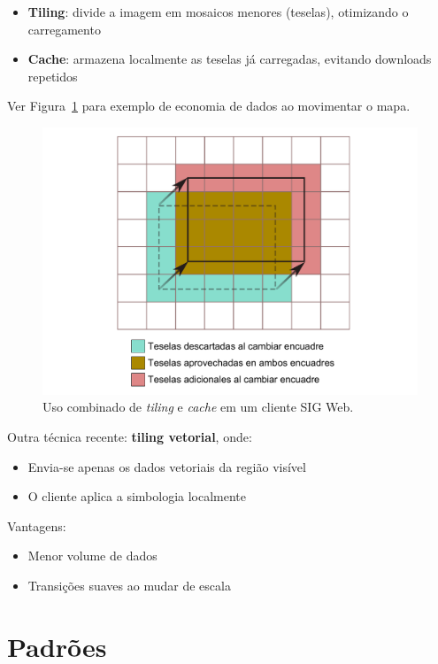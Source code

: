 \begin{itemize}
 \item \textbf{Tiling}: divide a imagem em mosaicos menores (teselas), otimizando o carregamento
 \item \textbf{Cache}: armazena localmente as teselas já carregadas, evitando downloads repetidos
\end{itemize}

Ver Figura~\ref{Fig:Tiling} para exemplo de economia de dados ao movimentar o mapa.

\begin{figure}[!hbt]   
\centering
\includegraphics[width=\textwidth]{Software/Tiling.pdf}
\caption{\small Uso combinado de \emph{tiling} e \emph{cache} em um cliente SIG Web.}
\label{Fig:Tiling} 
\end{figure}

Outra técnica recente: \textbf{tiling vetorial}, onde:

\begin{itemize}
 \item Envia-se apenas os dados vetoriais da região visível
 \item O cliente aplica a simbologia localmente
\end{itemize}

Vantagens:

\begin{itemize}
 \item Menor volume de dados
 \item Transições suaves ao mudar de escala
\end{itemize}

\section{Padrões}

